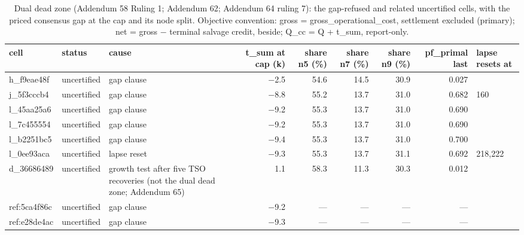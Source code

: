 \begin{table}[htbp]
\centering
\scriptsize
\caption{Dual dead zone (Addendum 58 Ruling 1; Addendum 62; Addendum 64 ruling 7): the gap-refused and related uncertified cells, with the priced consensus gap at the cap and its node split. Objective convention: gross = gross\_operational\_cost, settlement excluded (primary); net = gross $-$ terminal salvage credit, beside; Q\_cc = Q + t\_sum, report-only.}
\label{tab:T9}
\begin{tabular}{lllrrrrrl}
\toprule
cell & status & cause & t\_sum at cap (k\texteuro{}) & share n5 (\%) & share n7 (\%) & share n9 (\%) & pf\_primal last & lapse resets at \\
\midrule
h\_f9eae48f & uncertified & gap clause & $-$2.5 & 54.6 & 14.5 & 30.9 & 0.027 &  \\
j\_5f3cccb4 & uncertified & gap clause & $-$8.8 & 55.2 & 13.7 & 31.0 & 0.682 & 160 \\
l\_45aa25a6 & uncertified & gap clause & $-$9.2 & 55.3 & 13.7 & 31.0 & 0.690 &  \\
l\_7c455554 & uncertified & gap clause & $-$9.2 & 55.3 & 13.7 & 31.0 & 0.690 &  \\
l\_b2251bc5 & uncertified & gap clause & $-$9.4 & 55.3 & 13.7 & 31.0 & 0.700 &  \\
l\_0ee93aca & uncertified & lapse reset & $-$9.3 & 55.3 & 13.7 & 31.1 & 0.692 & 218,222 \\
d\_36686489 & uncertified & growth test after five TSO recoveries (not the dual dead zone; Addendum 65) & 1.1 & 58.3 & 11.3 & 30.3 & 0.012 &  \\
ref:5ca4f86c & uncertified & gap clause & $-$9.2 & --- & --- & --- & --- &  \\
ref:e28de4ac & uncertified & gap clause & $-$9.3 & --- & --- & --- & --- &  \\
\bottomrule
\end{tabular}
\end{table}
